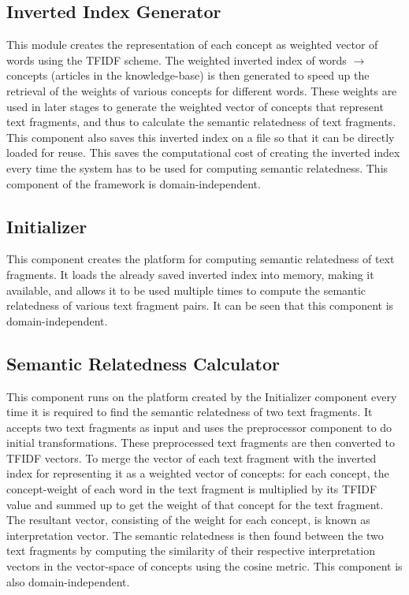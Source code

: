 \documentclass[journal,transmag]{IEEEtran}
\begin{document}
\subsection{\textbf{Inverted Index Generator}}
This module creates the representation of each concept as weighted vector of words using the TFIDF scheme. The weighted inverted index of words $\rightarrow$ concepts (articles in the knowledge-base) is then generated to speed up the retrieval of the weights of various concepts for different words. These weights are used in later stages to generate the weighted vector of concepts that represent text fragments, and thus to calculate the semantic relatedness of text fragments. This component also saves this inverted index on a file so that it can be directly loaded for reuse. This saves the computational cost of creating the inverted index every time the system has to be used for computing semantic relatedness. This component of the framework is domain-independent.
\subsection{\textbf{Initializer}}
This component creates the platform for computing semantic relatedness of text fragments. It loads the already saved inverted index into memory, making it available, and allows it to be used multiple times to compute the semantic relatedness of various text fragment pairs. It can be seen that this component is domain-independent.
\subsection{\textbf{Semantic Relatedness Calculator}}
This component runs on the platform created by the Initializer component every time it is required to find the semantic relatedness of two text fragments. It accepts two text fragments as input and uses the preprocessor component to do initial transformations. These preprocessed text fragments are then converted to TFIDF vectors. To merge the vector of each text fragment with the inverted index for representing it as a weighted vector of concepts: for each concept, the concept-weight of each word in the text fragment is multiplied by its TFIDF value and summed up to get the weight of that concept for the text fragment. The resultant vector, consisting of the weight for each concept, is known as interpretation vector. The semantic relatedness is then found between the two text fragments by computing the similarity of their respective interpretation vectors in the vector-space of concepts using the cosine metric. This component is also domain-independent.
\end{document}
